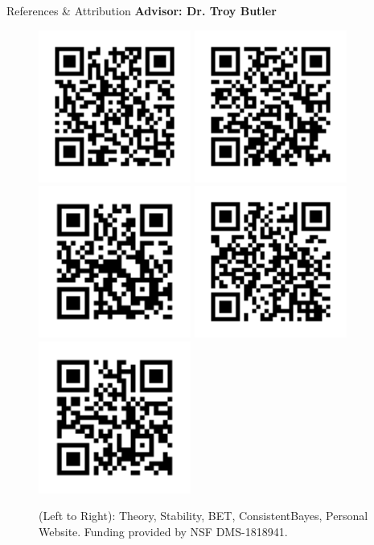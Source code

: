   \begin{block}{\Large References \& Attribution}
    \centering
    \textbf{Advisor: Dr. Troy Butler}
    \begin{figure}
        \includegraphics[width=5cm]{ref-theory}
        \includegraphics[width=5cm]{ref-stability}
        \includegraphics[width=5cm]{ref-bet}
        \includegraphics[width=5cm]{ref-cb}
        \includegraphics[width=5cm]{ref-website}
    \caption*{\centering (Left to Right): Theory, Stability, BET, ConsistentBayes, Personal Website. \newline Funding provided by NSF DMS-1818941.}
    \end{figure}
   

  

  \end{block}

